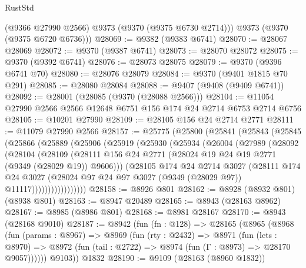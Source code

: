 \begin{lexlean}{RustStd}
\begin{coremodule}
{\begin{coremodule}
{{{{{{{{{{{{{{{{{{{{{{{{{{{{{{{{{{{{{{{        (@9366 @27990 @2566)
        @9373
        (@9370 (@9375 @6730 @2714)))
      @9373
      (@9370 (@9375 @6720 @6736)))
@28069 := @9382 (@9383 @6741)
@28070 := @28067 @28069
@28072 := @9370 (@9387 @6741)
@28073 := @28070 @28072
@28075 := @9370 (@9392 @6741)
@28076 := @28073 @28075
@28079 := @9370 (@9396 @6741 @70)
@28080 := @28076 @28079
@28084 := @9370 (@9401 @1815 @70 @291)
@28085 := @28080 @28084
@28088 := @9407 (@9408 (@9409 @6741))
@28092 := @28001 (@28085 (@9370 (@28088 @2566)))
@28104 := @11054 @27990 @2566 @2566 @12648 @6751 @156 @174 @24 @2714 @6753 @2714 @6756
@28105 := @10201 @27990
@28109 := @28105 @156 @24 @2714 @2771
@28111 := @11079 @27990 @2566
@28157 := @25775
    (@25800
      (@25841
        (@25843
          (@25845
            (@25866
              (@25889
                (@25906
                  (@25919
                    (@25930
                      (@25934
                        (@26004
                          (@27989
                            (@28092
                              (@28104
                                (@28109
                                  (@28111
                                    @156
                                    @24
                                    @2771
                                    (@28024 @19 @24 @19 @2771 (@9349 (@28029 @19)) @9606)))
                                (@28105
                                  @174
                                  @24
                                  @2714
                                  @3027
                                  (@28111
                                    @174
                                    @24
                                    @3027
                                    (@28024
                                      @97
                                      @24
                                      @97
                                      @3027
                                      (@9349 (@28029 @97))
                                      @11117)))))))))))))))))
@28158 := @8926 @801
@28162 := @8928 (@8932 @801) (@8938 @801)
@28163 := @8947 @20489
@28165 := @8943 (@28163 @8962)
@28167 := @8985 (@8986 @801)
@28168 := @8981 @28167
@28170 := @8943 (@28168 @9010)
@28187 := @8942
    (fun (fn : @128) =>
    @28165
      (@8965
        (@8968
          (fun (params : @8967) =>
          @8969
            (fun (rty : @2432) =>
            @8971
              (fun (lets : @8970) =>
              @8972 (fun (tail : @2722) => @8974 (fun (Γ : @8973) => @28170 @9057))))))
        @9103))
    @1832
@28190 := @9109 (@28163 (@8960 @1832))
}}}}}}}}}}}}}}}}}}}}}}}}}}}}}}}}}}}}}}}
\end{coremodule}}
\end{coremodule}
\end{lexlean}

